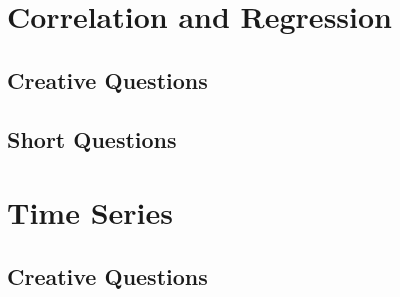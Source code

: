 \documentclass[a4paper,oneside]{book}
\begin{document}
\chapter{Correlation and Regression} 
\section{Creative Questions}
\section{Short Questions}

\chapter{Time Series} 
\section{Creative Questions}
\end{document}
